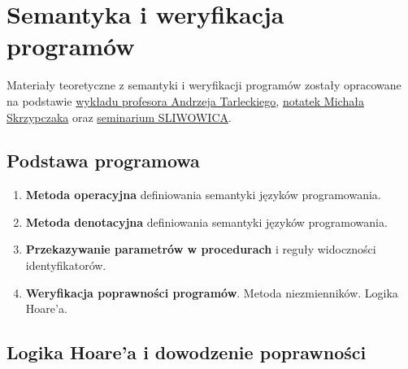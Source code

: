 \chapter{Semantyka i weryfikacja programów}

Materiały teoretyczne z semantyki i weryfikacji programów zostały opracowane na podstawie \href{https://www.mimuw.edu.pl/~tarlecki/cv.pdf}{wykładu profesora Andrzeja Tarleckiego}, \href{https://www.mimuw.edu.pl/~mskrzypczak/teaching/SemWer2021/}{notatek Michała Skrzypczaka} oraz \href{https://www.mimuw.edu.pl/~czarnik/sliwowica/index.html}{seminarium SLIWOWICA}.

\section*{Podstawa programowa}
\begin{enumerate}
    \item \textbf{Metoda operacyjna} definiowania semantyki języków programowania.
    \item \textbf{Metoda denotacyjna} definiowania semantyki języków programowania.
    \item \textbf{Przekazywanie parametrów w procedurach} i reguły widoczności identyfikatorów.
    \item \textbf{Weryfikacja poprawności programów}. Metoda niezmienników. Logika Hoare'a.
\end{enumerate}

\section{Logika Hoare'a i dowodzenie poprawności}

